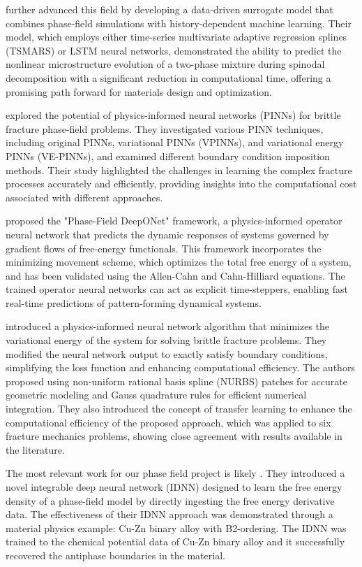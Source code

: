 \cite{montes2021accelerating} further advanced this field by developing a data-driven surrogate model that combines phase-field simulations with history-dependent machine learning. Their model, which employs either time-series multivariate adaptive regression splines (TSMARS) or LSTM neural networks, demonstrated the ability to predict the nonlinear microstructure evolution of a two-phase mixture during spinodal decomposition with a significant reduction in computational time, offering a promising path forward for materials design and optimization.

\cite{ghaffari2023deep} explored the potential of physics-informed neural networks (PINNs) for brittle fracture phase-field problems. They investigated various PINN techniques, including original PINNs, variational PINNs (VPINNs), and variational energy PINNs (VE-PINNs), and examined different boundary condition imposition methods. Their study highlighted the challenges in learning the complex fracture processes accurately and efficiently, providing insights into the computational cost associated with different approaches.

\cite{li2023phase} proposed the "Phase-Field DeepONet" framework, a physics-informed operator neural network that predicts the dynamic responses of systems governed by gradient flows of free-energy functionals. This framework incorporates the minimizing movement scheme, which optimizes the total free energy of a system, and has been validated using the Allen-Cahn and Cahn-Hilliard equations. The trained operator neural networks can act as explicit time-steppers, enabling fast real-time predictions of pattern-forming dynamical systems.

\cite{goswami2020transfer} introduced a physics-informed neural network algorithm that minimizes the variational energy of the system for solving brittle fracture problems. They modified the neural network output to exactly satisfy boundary conditions, simplifying the loss function and enhancing computational efficiency. The authors proposed using non-uniform rational basis spline (NURBS) patches for accurate geometric modeling and Gauss quadrature rules for efficient numerical integration. They also introduced the concept of transfer learning to enhance the computational efficiency of the proposed approach, which was applied to six fracture mechanics problems, showing close agreement with results available in the literature.

The most relevant work for our phase field project is likely \cite{teichert2019machine}. They introduced a novel integrable deep neural network (IDNN) designed to learn the free energy density of a phase-field model by directly ingesting the free energy derivative data. The effectiveness of their IDNN approach was demonstrated through a material physics example: Cu-Zn binary alloy with B2-ordering. The IDNN was trained to the chemical potential data of Cu-Zn binary alloy and it successfully recovered the antiphase boundaries in the material. 


